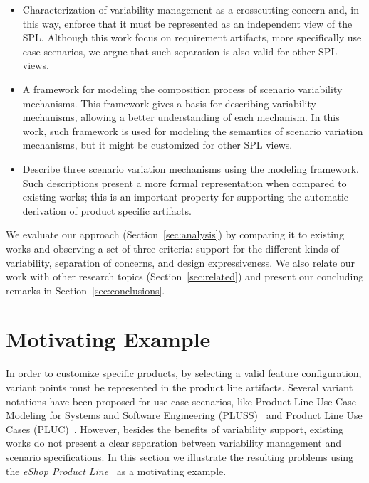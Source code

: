 \begin{itemize}

\item Characterization of variability management as a crosscutting concern and, in this way, enforce that it  
must be represented as an independent view of the SPL. Although this work focus on requirement artifacts, 
more specifically use case scenarios, we argue that such separation is also valid for other SPL views.
  
\item A framework for modeling the composition process of scenario variability mechanisms. 
This framework gives a basis for describing variability mechanisms, 
allowing a better understanding of each mechanism. In this work, such framework is used for modeling 
the semantics of scenario variation mechanisms, but it might be customized for other SPL views.

\item Describe three scenario variation mechanisms using the
modeling framework. Such descriptions present
a more formal representation when compared to existing works; this is an
important property for supporting the automatic derivation of product
specific artifacts.
\end{itemize}

We evaluate our approach (Section~\ref{sec:analysis}) by comparing it 
to existing works and observing a set of three criteria: support for the 
different kinds of variability, separation of concerns, and design expressiveness.  We 
also relate our work with other research topics (Section~\ref{sec:related}) and present our concluding 
remarks in Section~\ref{sec:conclusions}.

\section{Motivating Example}
\label{sec:example}

In order to customize specific products, by selecting a valid feature configuration, variant points must be represented in the 
product line artifacts. Several variant notations have been proposed for use case scenarios, like Product Line Use Case Modeling for Systems and 
Software Engineering (PLUSS)~\cite{eriksson-splc-2005} and Product Line Use Cases (PLUC)~\cite{bertolino-esec-2003}. However, besides
the benefits of variability support, existing works do not present a clear separation between variability 
management and scenario specifications. In this section we illustrate the resulting problems using the \emph{eShop Product Line}~\cite{eshop-url} 
as a motivating example. 


